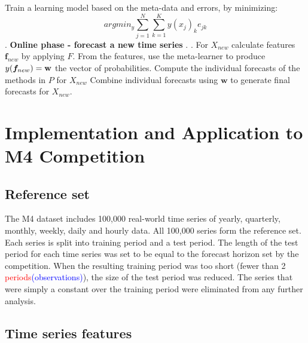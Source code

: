\documentclass[11pt,a4paper,]{article}
\theoremstyle{definition}
\theoremstyle{definition}
\theoremstyle{definition}
\theoremstyle{remark}
\begin{document}
\begin{algorithm}[!ht]
\begin{algorithmic}[1]
{            \State Train a learning model based on the meta-data and errors, by minimizing:
            $$ argmin_y \sum_{j=1}^N \sum_{k=1}^K y(x_j)_k e_{jk}  $$
            .}
    \Statex
     \Statex \textbf{Online phase - forecast a new time series}
    \Statex {}
    \Statex \hspace{1cm} .
     \Statex {}
      \Statex \hspace{1cm}.
  \State For $X_{new}$ calculate features $\bm{f}_{new}$ by applying $F$.
  \State From the features, use the meta-learner to produce $y(\bm{f}_{new})=\bf{w}$ the vector of probabilities. 
  \State Compute the individual forecasts of the methods in $P$ for $X_{new}$
  \State Combine individual forecasts using $\bm{w}$ to generate final forecasts for {$X_{new}$}.
   \end{algorithmic}

\end{algorithm}

\clearpage

\section{Implementation and Application to M4
Competition}\label{M4application}

\subsection{Reference set}\label{reference-set}

The M4 dataset includes 100,000 real-world time series of yearly,
quarterly, monthly, weekly, daily and hourly data. All 100,000 series
form the reference set. Each series is split into training period and a
test period. The length of the test period for each time series was set
to be equal to the forecast horizon set by the competition. When the
resulting training period was too short (fewer than 2
\textcolor{red}{periods}\textcolor{blue}{(observations)}), the size of
the test period was reduced. The series that were simply a constant over
the training period were eliminated from any further analysis.

\subsection{Time series features}\label{time-series-features}
\end{document}
